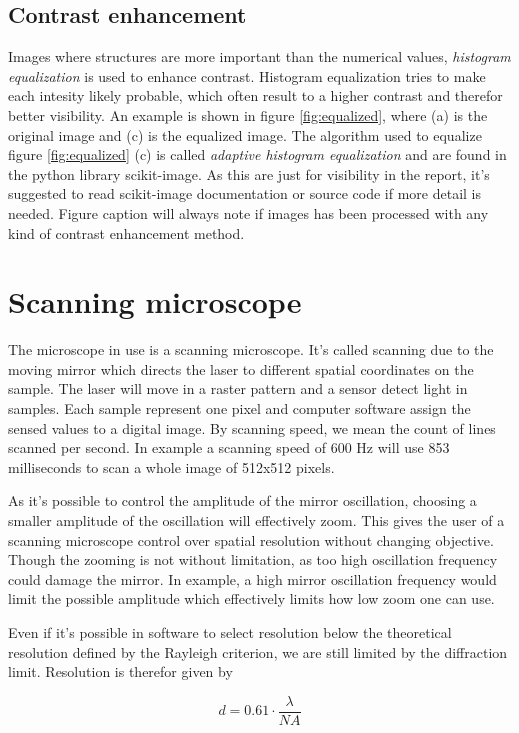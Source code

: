\subsection{Contrast enhancement}
Images where structures are more important than the numerical values, \textit{histogram equalization} is used to enhance contrast. Histogram equalization tries to make each intesity likely probable, which often result to a higher contrast and therefor better visibility. An example is shown in figure \ref{fig:equalized}, where (a) is the original image and (c) is the equalized image. The algorithm used to equalize figure \ref{fig:equalized} (c) is called \textit{adaptive histogram equalization} and are found in the python library scikit-image. As this are just for visibility in the report, it’s suggested to read scikit-image documentation or source code if more detail is needed. Figure caption will always note if images has been processed with any kind of contrast enhancement method.

%
%
\section{Scanning microscope}
The microscope in use is a scanning microscope. It’s called scanning due to the moving mirror which directs the laser to different spatial coordinates on the sample. The laser will move in a raster pattern and a sensor detect light in samples. Each sample represent one pixel and computer software assign the sensed values to a digital image. By scanning speed, we mean the count of lines scanned per second. In example a scanning speed of 600 Hz will use 853 milliseconds to scan a whole image of 512x512 pixels.

As it’s possible to control the amplitude of the mirror oscillation, choosing a smaller amplitude of the oscillation will effectively zoom. This gives the user of a scanning microscope control over spatial resolution without changing objective. Though the zooming is not without limitation, as too high oscillation frequency could damage the mirror. In example, a high mirror oscillation frequency would limit the possible amplitude which effectively limits how low zoom one can use.

Even if it's possible in software to select resolution below the theoretical resolution defined by the Rayleigh criterion, we are still limited by the diffraction limit. Resolution is therefor given by

\begin{equation}
d = 0.61 \cdot \frac{\lambda}{NA}
\end{equation}

